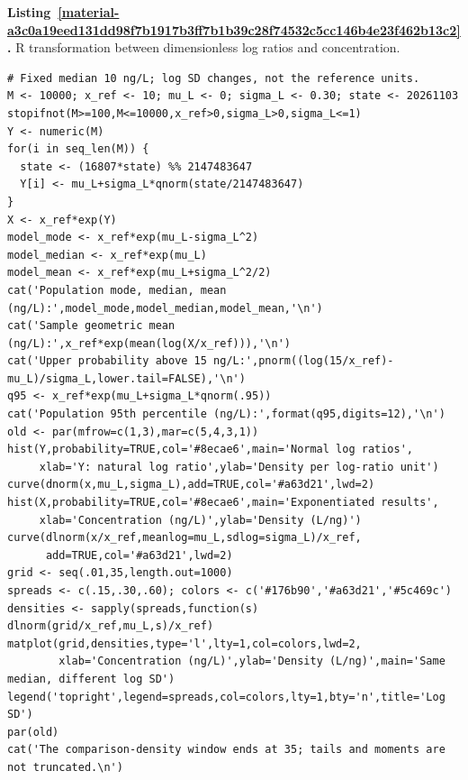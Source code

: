 \documentclass[11pt,a4paper]{article}
\newcounter{listing}
\begin{document}
\par\medskip
{}
\label{material-a3c0a19eed131dd98f7b1917b3ff7b1b39c28f74532c5cc146b4e23f462b13c2}
\noindent\textbf{Listing~\ref*{material-a3c0a19eed131dd98f7b1917b3ff7b1b39c28f74532c5cc146b4e23f462b13c2}.} R transformation between dimensionless log ratios and concentration.\par\nopagebreak
\begin{Verbatim}[fontsize=\footnotesize,breaklines=true,breakanywhere=true]
# Fixed median 10 ng/L; log SD changes, not the reference units.
M <- 10000; x_ref <- 10; mu_L <- 0; sigma_L <- 0.30; state <- 20261103
stopifnot(M>=100,M<=10000,x_ref>0,sigma_L>0,sigma_L<=1)
Y <- numeric(M)
for(i in seq_len(M)) {
  state <- (16807*state) %% 2147483647
  Y[i] <- mu_L+sigma_L*qnorm(state/2147483647)
}
X <- x_ref*exp(Y)
model_mode <- x_ref*exp(mu_L-sigma_L^2)
model_median <- x_ref*exp(mu_L)
model_mean <- x_ref*exp(mu_L+sigma_L^2/2)
cat('Population mode, median, mean (ng/L):',model_mode,model_median,model_mean,'\n')
cat('Sample geometric mean (ng/L):',x_ref*exp(mean(log(X/x_ref))),'\n')
cat('Upper probability above 15 ng/L:',pnorm((log(15/x_ref)-mu_L)/sigma_L,lower.tail=FALSE),'\n')
q95 <- x_ref*exp(mu_L+sigma_L*qnorm(.95))
cat('Population 95th percentile (ng/L):',format(q95,digits=12),'\n')
old <- par(mfrow=c(1,3),mar=c(5,4,3,1))
hist(Y,probability=TRUE,col='#8ecae6',main='Normal log ratios',
     xlab='Y: natural log ratio',ylab='Density per log-ratio unit')
curve(dnorm(x,mu_L,sigma_L),add=TRUE,col='#a63d21',lwd=2)
hist(X,probability=TRUE,col='#8ecae6',main='Exponentiated results',
     xlab='Concentration (ng/L)',ylab='Density (L/ng)')
curve(dlnorm(x/x_ref,meanlog=mu_L,sdlog=sigma_L)/x_ref,
      add=TRUE,col='#a63d21',lwd=2)
grid <- seq(.01,35,length.out=1000)
spreads <- c(.15,.30,.60); colors <- c('#176b90','#a63d21','#5c469c')
densities <- sapply(spreads,function(s) dlnorm(grid/x_ref,mu_L,s)/x_ref)
matplot(grid,densities,type='l',lty=1,col=colors,lwd=2,
        xlab='Concentration (ng/L)',ylab='Density (L/ng)',main='Same median, different log SD')
legend('topright',legend=spreads,col=colors,lty=1,bty='n',title='Log SD')
par(old)
cat('The comparison-density window ends at 35; tails and moments are not truncated.\n')

\end{Verbatim}

\medskip
\end{document}
